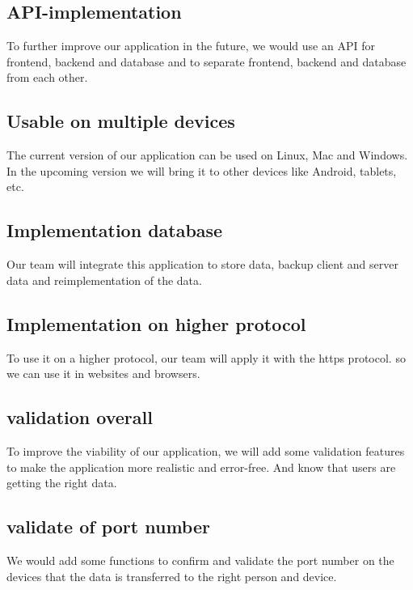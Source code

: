     \subsection{API-implementation}\label{subsec:api-implementation}
    To further improve our application in the future, we would use an API for frontend,
    backend and database and to separate frontend, backend and database from each other.
    
    \subsection{Usable on multiple devices} \label{subsec:usable-on-multiple-devices}
    The current version of our application can be used on Linux, Mac and Windows.
    In the upcoming version we will bring it to other devices like Android, tablets, etc.

    \subsection{Implementation database}\label{subsec:implementation-database}
    Our team will integrate this application to store data, backup client and server data and 
    reimplementation of the data.

    \subsection{Implementation on higher protocol}\label{subsec:implementation-on-higher-protocol}
    To use it on a higher protocol, our team will apply it with the https protocol. 
    so we can use it in websites and browsers.


	\subsection{validation overall}\label{subsec:validation overall}
	To improve the viability of our application, we will add some validation features to make the application more realistic and error-free.
	And know that users are getting the right data.
	

   \subsection{validate of port number}\label{subsec:validate of port number}
	We would add some functions to confirm and validate the port number on the devices
	that the data is transferred to the right person and device.
   




